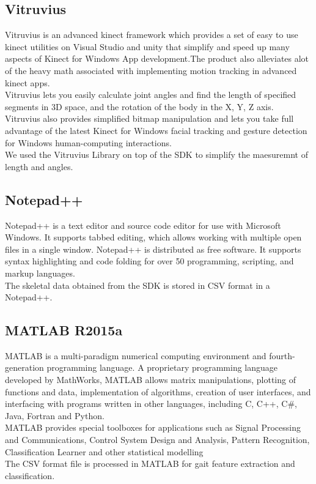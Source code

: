 \subsection{Vitruvius }\label{Vitruvius}
\noindent Vitruvius is an advanced kinect framework which provides a set of easy to use kinect utilities on Visual Studio and unity that simplify and speed up many aspects of Kinect for Windows App development.The product also alleviates alot of the heavy math associated with implementing motion tracking in advanced kinect apps.\\
Vitruvius lets you easily calculate joint angles and find the length of specified segments in 3D space, and the rotation of the body in the X, Y, Z axis.\\
Vitruvius also provides simplified bitmap manipulation and lets you take full advantage of the latest Kinect for Windows facial tracking and gesture detection for Windows human-computing interactions.\\ 
We used the Vitruvius Library on top of the SDK to simplify the maesuremnt of length and angles.

\subsection{Notepad++ }\label{Notepad++ } 
\noindent Notepad++ is a text editor and source code editor for use with Microsoft Windows. It supports tabbed editing, which allows working with multiple open files in a single window. Notepad++ is distributed as free software. It supports syntax highlighting and code folding for over 50 programming, scripting, and markup languages.\\
The skeletal data obtained from the SDK is stored in CSV format in a Notepad++.

\subsection{MATLAB R2015a }\label{MATLAB R2015a }
\noindent MATLAB is a multi-paradigm numerical computing environment and fourth-generation programming language. A proprietary programming language developed by MathWorks, MATLAB allows matrix manipulations, plotting of functions and data, implementation of algorithms, creation of user interfaces, and interfacing with programs written in other languages, including C, C++, C\#, Java, Fortran and Python.\\
MATLAB provides special toolboxes for applications such as Signal Processing and Communications, Control System Design and Analysis, Pattern Recognition, Classification Learner and other statistical modelling \\
The CSV format file is processed in MATLAB for gait feature extraction and classification. 

